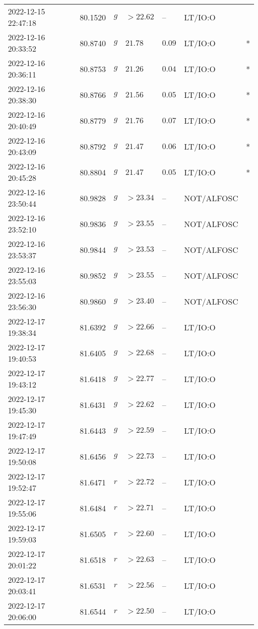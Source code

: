 \documentclass{nature_plusfigure}
\begin{document}
\begin{supplement}
\begin{center}
\begin{longtable}{lllllll}
2022-12-15 22:47:18 & 80.1520 & $g$ & $>22.62$ & -- & LT/IO:O &  \\ 
2022-12-16 20:33:52 & 80.8740 & $g$ & $21.78$ & $0.09$ & LT/IO:O & * \\ 
2022-12-16 20:36:11 & 80.8753 & $g$ & $21.26$ & $0.04$ & LT/IO:O & * \\ 
2022-12-16 20:38:30 & 80.8766 & $g$ & $21.56$ & $0.05$ & LT/IO:O & * \\ 
2022-12-16 20:40:49 & 80.8779 & $g$ & $21.76$ & $0.07$ & LT/IO:O & * \\ 
2022-12-16 20:43:09 & 80.8792 & $g$ & $21.47$ & $0.06$ & LT/IO:O & * \\ 
2022-12-16 20:45:28 & 80.8804 & $g$ & $21.47$ & $0.05$ & LT/IO:O & * \\ 
2022-12-16 23:50:44 & 80.9828 & $g$ & $>23.34$ & -- & NOT/ALFOSC &  \\ 
2022-12-16 23:52:10 & 80.9836 & $g$ & $>23.55$ & -- & NOT/ALFOSC &  \\ 
2022-12-16 23:53:37 & 80.9844 & $g$ & $>23.53$ & -- & NOT/ALFOSC &  \\ 
2022-12-16 23:55:03 & 80.9852 & $g$ & $>23.55$ & -- & NOT/ALFOSC &  \\ 
2022-12-16 23:56:30 & 80.9860 & $g$ & $>23.40$ & -- & NOT/ALFOSC &  \\ 
2022-12-17 19:38:34 & 81.6392 & $g$ & $>22.66$ & -- & LT/IO:O &  \\ 
2022-12-17 19:40:53 & 81.6405 & $g$ & $>22.68$ & -- & LT/IO:O &  \\ 
2022-12-17 19:43:12 & 81.6418 & $g$ & $>22.77$ & -- & LT/IO:O &  \\ 
2022-12-17 19:45:30 & 81.6431 & $g$ & $>22.62$ & -- & LT/IO:O &  \\ 
2022-12-17 19:47:49 & 81.6443 & $g$ & $>22.59$ & -- & LT/IO:O &  \\ 
2022-12-17 19:50:08 & 81.6456 & $g$ & $>22.73$ & -- & LT/IO:O &  \\ 
2022-12-17 19:52:47 & 81.6471 & $r$ & $>22.72$ & -- & LT/IO:O &  \\ 
2022-12-17 19:55:06 & 81.6484 & $r$ & $>22.71$ & -- & LT/IO:O &  \\ 
2022-12-17 19:59:03 & 81.6505 & $r$ & $>22.60$ & -- & LT/IO:O &  \\ 
2022-12-17 20:01:22 & 81.6518 & $r$ & $>22.63$ & -- & LT/IO:O &  \\ 
2022-12-17 20:03:41 & 81.6531 & $r$ & $>22.56$ & -- & LT/IO:O &  \\ 
2022-12-17 20:06:00 & 81.6544 & $r$ & $>22.50$ & -- & LT/IO:O &  \\ 

\end{longtable}
\end{center}
\end{supplement}
\end{document}
